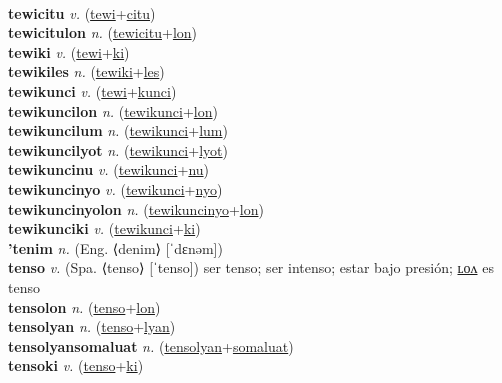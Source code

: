  \label{tewinyo} \\
\textbf{tewicitu} \textit{v.} (\hyperref[tewi]{tewi}+\hyperref[citu]{citu})
 \label{tewicitu} \\
\textbf{tewicitulon} \textit{n.} (\hyperref[tewicitu]{tewicitu}+\hyperref[lon]{lon})
 \label{tewicitulon} \\
\textbf{tewiki} \textit{v.} (\hyperref[tewi]{tewi}+\hyperref[ki]{ki})
 \label{tewiki} \\
\textbf{tewikiles} \textit{n.} (\hyperref[tewiki]{tewiki}+\hyperref[les]{les})
 \label{tewikiles} \\
\textbf{tewikunci} \textit{v.} (\hyperref[tewi]{tewi}+\hyperref[kunci]{kunci})
 \label{tewikunci} \\
\textbf{tewikuncilon} \textit{n.} (\hyperref[tewikunci]{tewikunci}+\hyperref[lon]{lon})
 \label{tewikuncilon} \\
\textbf{tewikuncilum} \textit{n.} (\hyperref[tewikunci]{tewikunci}+\hyperref[lum]{lum})
 \label{tewikuncilum} \\
\textbf{tewikuncilyot} \textit{n.} (\hyperref[tewikunci]{tewikunci}+\hyperref[lyot]{lyot})
 \label{tewikuncilyot} \\
\textbf{tewikuncinu} \textit{v.} (\hyperref[tewikunci]{tewikunci}+\hyperref[nu]{nu})
 \label{tewikuncinu} \\
\textbf{tewikuncinyo} \textit{v.} (\hyperref[tewikunci]{tewikunci}+\hyperref[nyo]{nyo})
 \label{tewikuncinyo} \\
\textbf{tewikuncinyolon} \textit{n.} (\hyperref[tewikuncinyo]{tewikuncinyo}+\hyperref[lon]{lon})
 \label{tewikuncinyolon} \\
\textbf{tewikunciki} \textit{v.} (\hyperref[tewikunci]{tewikunci}+\hyperref[ki]{ki})
 \label{tewikunciki} \\
\textbf{'tenim} \textit{n.} (Eng. ⟨denim⟩ [ˈdɛnəm])
 \label{'tenim} \\
\textbf{tenso} \textit{v.} (Spa. ⟨tenso⟩ [ˈtenso])
ser tenso; ser intenso; estar bajo presión; \hyperref[tensolon]{ʟᴏᴧ} es tenso \label{tenso} \\
\textbf{tensolon} \textit{n.} (\hyperref[tenso]{tenso}+\hyperref[lon]{lon})
 \label{tensolon} \\
\textbf{tensolyan} \textit{n.} (\hyperref[tenso]{tenso}+\hyperref[lyan]{lyan})
 \label{tensolyan} \\
\textbf{tensolyansomaluat} \textit{n.} (\hyperref[tensolyan]{tensolyan}+\hyperref[somaluat]{somaluat})
 \label{tensolyansomaluat} \\
\textbf{tensoki} \textit{v.} (\hyperref[tenso]{tenso}+\hyperref[ki]{ki})
